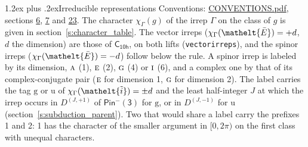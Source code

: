 \documentclass[10pt,a4paper]{article}
\makeatletter
\renewcommand\section{\@startsection{section}{1}{\z@}{-3ex plus -1ex minus -.2ex}%
  {1.2ex plus .2ex}{\normalfont\large\sffamily\bfseries\color{parttitle}}}
\numberwithin{equation}{section}
\newcommand{\eltfont}[1]{{\let\sigma\eltsigma\mathelt{#1}}}
\newcommand{\grp}[1]{\mathsf{#1}}
\newcommand{\irr}[1]{\text{\normalfont\scshape #1}}
\newcommand{\elt}[1]{\eltfont{#1}}
\newcommand{\ptag}[1]{\mathrm{#1}}
\newcommand{\irrJp}[2]{D^{(#1,#2)}}
\newcommand{\irchar}[1]{\chi_{#1}}
\newcommand{\barred}[1]{\bar{#1}}
\newcommand{\lift}[1]{\tilde{#1}}
\makeatother
\begin{document}
\section{Irreducible representations}\label{s:irreps}
Conventions: \href{../../CONVENTIONS.pdf}{CONVENTIONS.pdf}, sections \href{../../../rotation/CONVENTIONS.pdf\#conv.6}{6}, \href{../../../rotation/CONVENTIONS.pdf\#conv.7}{7} and \href{../../CONVENTIONS.pdf\#conv.23}{23}.
\leavevmode\label{n:function.character}\label{n:irrep.Gamma}The character $\irchar{\Gamma}(g)$ of the irrep $\Gamma$ on the class of $g$ is given in section~\ref{s:character_table}. \label{n:index.dimension}The vector irreps ($\irchar{\Gamma}(\elt{\barred{E}}) = +d$, $d$ the dimension) are those of \href{../../../rotation/data/pdf/C10h.pdf}{$\grp{C_{10h}}$}, on both lifts (\texttt{vectorirreps}), and the spinor irreps ($\irchar{\Gamma}(\elt{\barred{E}}) = -d$) follow below the rule. A spinor irrep is labeled by its dimension, $\irr{a}$ (1), $\irr{e}$ (2), $\irr{g}$ (4) or $\irr{i}$ (6), and a complex one by that of its complex-conjugate pair ($\irr{e}$ for dimension 1, $\irr{g}$ for dimension 2). The label carries the tag $\ptag{g}$ or $\ptag{u}$ of $\irchar{\Gamma}(\elt{\lift{i}}) = \pm d$ and the least half-integer $J$ at which the irrep occurs in $\irrJp{J}{+1}$ of $\grp{Pin^{-}(3)}$ for $\ptag{g}$, or in $\irrJp{J}{-1}$ for $\ptag{u}$ (section~\ref{s:subduction_parent}). Two that would share a label carry the prefixes 1 and 2: 1 has the character of the smaller argument in $[0, 2\pi)$ on the first class with unequal characters.
\end{document}
